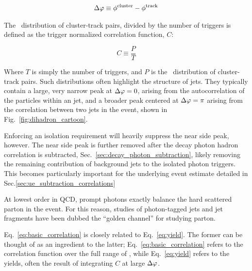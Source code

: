 \begin{equation}
	\Delta\varphi \equiv \phi^\mathrm{cluster} - \phi^\mathrm{track}
\end{equation}

 The \deltaphi~distribution of cluster-track pairs, divided by the number of triggers is defined as the trigger normalized correlation function, $C$:

\begin{equation}
\label{eq:basic_correlation}
	C \equiv \frac{P}{T}
\end{equation}

Where $T$ is simply the number of triggers, and $P$ is the \deltaphi~distribution of cluster-track pairs. Such distributions often highlight the structure of jets. They typically contain a large, very narrow peak at $\Delta\varphi=0$, arising from the autocorrelation of the particles within an jet, and a broader peak centered at $\Delta\varphi=\pi$ arising from the correlation between two jets in the event, shown in Fig.~\ref{fig:dihadron_cartoon}. 

Enforcing an isolation requirement will heavily suppress the near side peak, however. The near side peak is further removed after the decay photon hadron correlation is subtracted, Sec.~\ref{sec:decay_photon_subtraction}, likely removing the remaining contribution of background jets to the isolated photon triggers. This becomes particularly important for the underlying event estimate detailed in Sec.\ref{sec:ue_subtraction_correlations}


At lowest order in QCD, prompt photons exactly balance the hard scattered parton in the event. For this reason, studies of photon-tagged jets and jet fragments have been dubbed the ``golden channel'' for studying parton. %


Eq.~\ref{eq:basic_correlation} is closely related to Eq.~\ref{eq:yield}. The former can be thought of as an ingredient to the latter; Eq.~\ref{eq:basic_correlation} refers to the correlation function over the full range of \deltaphi, while Eq.~\ref{eq:yield} refers to the yields, often the result of integrating $C$ at large  $\Delta\varphi$.


